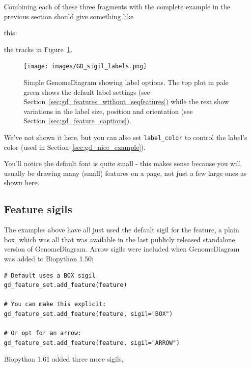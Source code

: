 \noindent Combining each of these three fragments with the complete example
in the previous section should give something like
\begin{htmlonly}
this:


\end{htmlonly}
\begin{latexonly}
the tracks in Figure~\ref{fig:gd_sigil_labels}.
\begin{figure}[htbp]
\centering
\texttt{[image: images/GD\_sigil\_labels.png]}
\caption{Simple GenomeDiagram showing label options.
The top plot in pale green shows the default label settings (see
Section~\ref{sec:gd_features_without_seqfeatures}) while the rest show
variations in the label size, position and orientation (see
Section~\ref{sec:gd_feature_captions}).
}
\label{fig:gd_sigil_labels}
\end{figure}
\end{latexonly}

We've not shown it here, but you can also set \texttt{label\_color} to
control the label's color (used in Section~\ref{sec:gd_nice_example}).

You'll notice the default font is quite small - this makes sense because
you will usually be drawing many (small) features on a page, not just a
few large ones as shown here.

\subsection{Feature sigils}
\label{sec:gd_sigils}

The examples above have all just used the default sigil for the feature, a
plain box, which was all that was available in the last publicly released standalone version of GenomeDiagram. Arrow sigils were included when
GenomeDiagram was added to Biopython 1.50:

\begin{verbatim}
# Default uses a BOX sigil
gd_feature_set.add_feature(feature)

# You can make this explicit:
gd_feature_set.add_feature(feature, sigil="BOX")

# Or opt for an arrow:
gd_feature_set.add_feature(feature, sigil="ARROW")
\end{verbatim}

\noindent
Biopython 1.61 added three more sigils,

